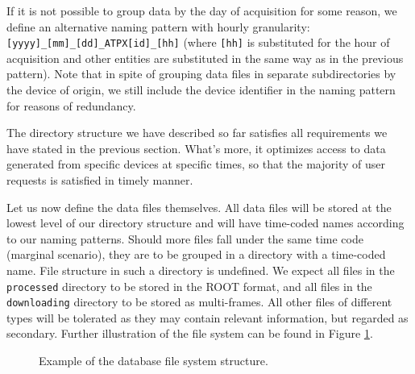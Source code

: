 If it is not possible to group data by the day of acquisition for some reason, we define an alternative naming pattern with hourly granularity: \texttt{[yyyy]\_[mm]\_[dd]\_ATPX[id]\_[hh]} (where \texttt{[hh]} is substituted for the hour of acquisition and other entities are substituted in the same way as in the previous pattern). Note that in spite of grouping data files in separate subdirectories by the device of origin, we still include the device identifier in the naming pattern for reasons of redundancy.

The directory structure we have described so far satisfies all requirements we have stated in the previous section. What's more, it optimizes access to data generated from specific devices at specific times, so that the majority of user requests is satisfied in timely manner.

Let us now define the data files themselves. All data files will be stored at the lowest level of our directory structure and will have time-coded names according to our naming patterns. Should more files fall under the same time code (marginal scenario), they are to be grouped in a directory with a time-coded name. File structure in such a directory is undefined. We expect all files in the \texttt{processed} directory to be stored in the ROOT format, and all files in the \texttt{downloading} directory to be stored as multi-frames. All other files of different types will be tolerated as they may contain relevant information, but regarded as secondary. Further illustration of the file system can be found in Figure \ref{fig:db-structure}.

\begin{figure}[t]
\begin{center}


\caption{Example of the database file system structure.}
\label{fig:db-structure}
\end{center}
\end{figure}

